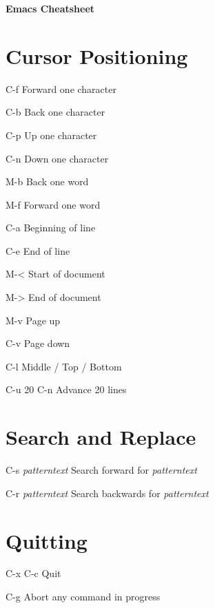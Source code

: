 \documentclass[11pt,a4paper]{article}
\begin{document}
\begin{center}
  {
    \huge \bfseries Emacs Cheatsheet
    \vspace{0.5 cm}
  }
\end{center}

\begin{multicols}{2}

\section{Cursor Positioning}
\begin{eqlist}
\item[C-f] Forward one character
\item[C-b] Back one character
\item[C-p] Up one character
\item[C-n] Down one character
\item[M-b] Back one word
\item[M-f] Forward one word
\item[C-a] Beginning of line
\item[C-e] End of line
\item[M-\textless] Start of document
\item[M-\textgreater] End of document
\item[M-v] Page up
\item[C-v] Page down
\item[C-l] Middle / Top / Bottom
\item[C-u 20 C-n] Advance 20 lines
\end{eqlist}

\section{Search and Replace}
\begin{eqlist}
\item[C-s \textit{patterntext}] Search forward for
  \textit{patterntext}
\item[C-r \textit{patterntext}] Search backwards for
  \textit{patterntext}
\end{eqlist}

\section{Quitting}
\begin{eqlist}
\item[C-x C-c] Quit
\item[C-g] Abort any command in progress
\end{eqlist}


\end{multicols}
\end{document}
